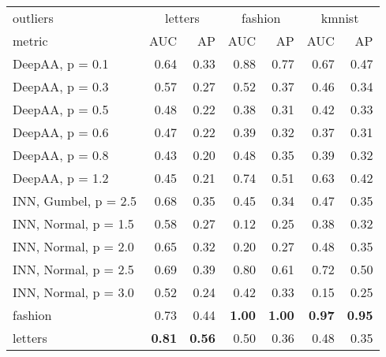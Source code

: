 \begin{tabular}{lrrrrrr}
\toprule
{outliers} & \multicolumn{2}{c}{letters} & \multicolumn{2}{c}{fashion} & \multicolumn{2}{c}{kmnist} \\
{metric} & {AUC} & {AP} & {AUC} & {AP} & {AUC} & {AP} \\
\midrule
DeepAA, p = 0.1 & 0.64 & 0.33 & 0.88 & 0.77 & 0.67 & 0.47 \\
DeepAA, p = 0.3 & 0.57 & 0.27 & 0.52 & 0.37 & 0.46 & 0.34 \\
DeepAA, p = 0.5 & 0.48 & 0.22 & 0.38 & 0.31 & 0.42 & 0.33 \\
DeepAA, p = 0.6 & 0.47 & 0.22 & 0.39 & 0.32 & 0.37 & 0.31 \\
DeepAA, p = 0.8 & 0.43 & 0.20 & 0.48 & 0.35 & 0.39 & 0.32 \\
DeepAA, p = 1.2 & 0.45 & 0.21 & 0.74 & 0.51 & 0.63 & 0.42 \\
INN, Gumbel, p = 2.5 & 0.68 & 0.35 & 0.45 & 0.34 & 0.47 & 0.35 \\
INN, Normal, p = 1.5 & 0.58 & 0.27 & 0.12 & 0.25 & 0.38 & 0.32 \\
INN, Normal, p = 2.0 & 0.65 & 0.32 & 0.20 & 0.27 & 0.48 & 0.35 \\
INN, Normal, p = 2.5 & 0.69 & 0.39 & 0.80 & 0.61 & 0.72 & 0.50 \\
INN, Normal, p = 3.0 & 0.52 & 0.24 & 0.42 & 0.33 & 0.15 & 0.25 \\
fashion & 0.73 & 0.44 & \bfseries 1.00 & \bfseries 1.00 & \bfseries 0.97 & \bfseries 0.95 \\
letters & \bfseries 0.81 & \bfseries 0.56 & 0.50 & 0.36 & 0.48 & 0.35 \\
\bottomrule
\end{tabular}
